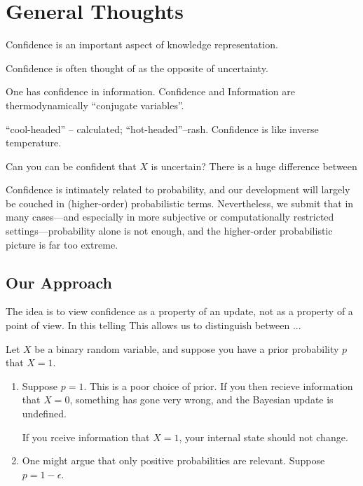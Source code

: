 \documentclass{article}
\begin{document}
\section{General Thoughts}
Confidence is an important aspect of knowledge representation.

Confidence is often thought of as the opposite of uncertainty.


One has confidence in information. 
Confidence and Information are thermodynamically ``conjugate variables''. 


``cool-headed'' -- calculated; ``hot-headed''--rash. Confidence is like inverse temperature.

Can you can be confident that $X$ is uncertain?
There is a huge difference between



Confidence is intimately related to probability, and our development will largely be couched in (higher-order) probabilistic terms.
Nevertheless, we submit that in many cases---and especially in more subjective or computationally restricted settings---probability alone is not enough, and the higher-order probabilistic picture is far too extreme.



\subsection*{Our Approach}
The idea is to view confidence as a property of an update, not as a property of a point of view.
In this telling
This allows us to distinguish between ...

\begin{example}
Let $X$ be a binary random variable, and suppose you have a prior probability $p$ that $X=1$.
\begin{enumerate}
    \item Suppose $p=1$.
    This is a poor choice of prior.
    If you then recieve information that $X=0$, something has gone very wrong, and the Bayesian update is undefined.

    If you rceive information that $X = 1$, your internal state should not change.

    \item One might argue that only positive probabilities are relevant.
    Suppose $p = 1 - \epsilon$.
\end{enumerate}
\end{example}
\end{document}
